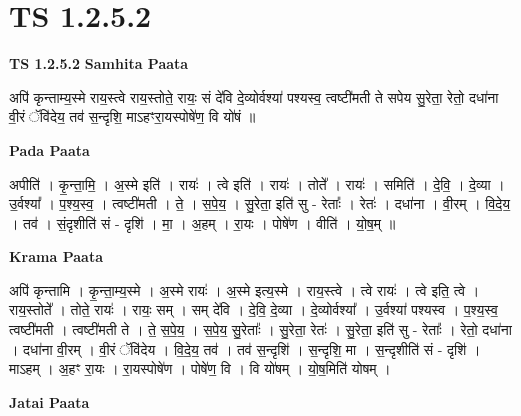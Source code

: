 \documentclass[17pt]{extarticle}
\begin{document}
\section{ TS 1.2.5.2 }

\textbf{TS 1.2.5.2 } \newline
\textbf{Samhita Paata} \newline

अपि॑ कृन्ताम्य॒स्मे राय॒स्त्वे राय॒स्तोते॒ रायः॒ सं दे॑वि दे॒व्योर्वश्या॑ पश्यस्व॒ त्वष्टी॑मती ते सपेय सु॒रेता॒ रेतो॒ दधा॑ना वी॒रं ॅवि॑देय॒ तव॑ स॒न्दृशि॒ माऽहꣳरा॒यस्पोषे॑ण॒ वि यो॑षं ॥ \newline

\textbf{Pada Paata} \newline

अपीति॑ । कृ॒न्ता॒मि॒ । अ॒स्मे इति॑ । रायः॑ । त्वे इति॑ । रायः॑ । तोते᳚ । रायः॑ । समिति॑ । दे॒वि॒ । दे॒व्या । उ॒र्वश्या᳚ । प॒श्य॒स्व॒ । त्वष्टी॑मती । ते॒ । स॒पे॒य॒ । सु॒रेता॒ इति॑ सु - रेताः᳚ । रेतः॑ । दधा॑ना । वी॒रम् । वि॒दे॒य॒ । तव॑ । सं॒दृशीति॑ सं - दृशि॑ । मा॒ । अ॒हम् । रा॒यः । पोषे॑ण । वीति॑ । यो॒ष॒म् ॥  \newline


\textbf{Krama Paata} \newline

अपि॑ कृन्तामि । कृ॒न्ता॒म्य॒स्मे । अ॒स्मे रायः॑ । अ॒स्मे इत्य॒स्मे । राय॒स्त्वे । त्वे रायः॑ । त्वे इति॒ त्वे । राय॒स्तोते᳚ । तोते॒ रायः॑ । रायः॒ सम् । सम् दे॑वि । दे॒वि॒ दे॒व्या । दे॒व्योर्वश्या᳚ । उ॒र्वश्या॑ पश्यस्व । प॒श्य॒स्व॒ त्वष्टी॑मती । त्वष्टी॑मती ते । ते॒ स॒पे॒य॒ । स॒पे॒य॒ सु॒रेताः᳚ । सु॒रेता॒ रेतः॑ । सु॒रेता॒ इति॑ सु - रेताः᳚ । रेतो॒ दधा॑ना । दधा॑ना वी॒रम् । वी॒रं ॅवि॑देय । वि॒दे॒य॒ तव॑ । तव॑ स॒न्दृशि॑ । स॒न्दृशि॒ मा । स॒न्दृशीति॑ सं - दृशि॑ । माऽहम् । अ॒हꣳ रा॒यः । रा॒यस्पोषे॑ण । पोषे॑ण॒ वि । वि यो॑षम् । यो॒ष॒मिति॑ योषम् । \newline

\textbf{Jatai Paata} \newline
\end{document}
